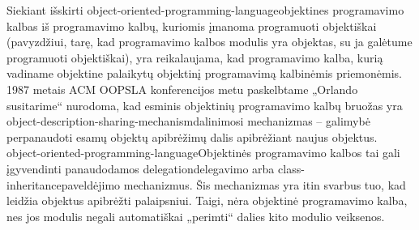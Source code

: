 Siekiant išskirti
\gls{object-oriented-programming-language}{objektines programavimo
kalbas} iš programavimo kalbų, kuriomis įmanoma programuoti
objektiškai (pavyzdžiui, tarę, kad programavimo kalbos 
modulis yra objektas, su ja galėtume programuoti objektiškai), yra
reikalaujama, kad programavimo kalba, kurią vadiname objektine
palaikytų objektinį programavimą kalbinėmis priemonėmis. 1987
metais ACM OOPSLA konferencijos metu paskelbtame „Orlando
susitarime“ 
\cite{Lieberman:1987:TO:62139.62144} nurodoma, kad esminis
objektinių programavimo kalbų bruožas yra 
\gls{object-description-sharing-mechanism}{dalinimosi 
mechanizmas} – galimybė perpanaudoti esamų objektų apibrėžimų dalis
apibrėžiant naujus objektus.
\gls{object-oriented-programming-language}{Objektinės programavimo kalbos}
tai gali įgyvendinti panaudodamos \gls{delegation}{delegavimo} arba
\gls{class-inheritance}{paveldėjimo}
mechanizmus.
Šis mechanizmas yra itin svarbus tuo, kad leidžia objektus apibrėžti
palaipsniui. Taigi,  nėra objektinė programavimo
kalba, nes jos modulis negali automatiškai „perimti“ dalies kito modulio
veiksenos.

